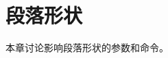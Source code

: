 \documentclass{book}
\begin{document}
\chapter{段落形状}\label{par:shape}

本章讨论影响段落形状的参数和命令。

\label{cschap:parindent2}\label{cschap:hsize2}\label{cschap:leftskip}\label{cschap:rightskip}\label{cschap:hangindent}\label{cschap:hangafter}\label{cschap:parshape}
\end{document}
